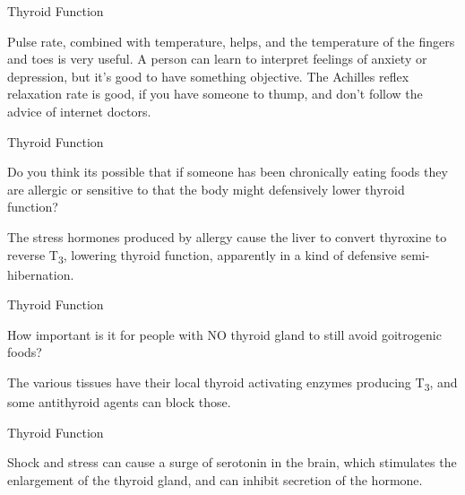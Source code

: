 \documentclass[11pt,oneside,openany,extrafontsizes]{memoir}
\begin{document}
\begin{standalonequote}{Thyroid Function}

    \begin{answer}
      Pulse rate, combined with temperature, helps, and the temperature of the fingers and toes is very useful. A person can learn to interpret feelings of anxiety or depression, but it's good to have something objective. The Achilles reflex relaxation rate is good, if you have someone to thump, and don't follow the advice of internet doctors.
    \end{answer}
\end{standalonequote}

\begin{qaexchange}{Thyroid Function}

    \begin{question}
        Do you think its possible that if someone has been chronically eating foods they are allergic or sensitive to that the body might defensively lower thyroid function?
    \end{question}

    \begin{answer}
      The stress hormones produced by allergy cause the liver to convert thyroxine to reverse T\textsubscript{3}, lowering thyroid function, apparently in a kind of defensive semi-hibernation.
    \end{answer}
\end{qaexchange}

\begin{qaexchange}{Thyroid Function}

    \begin{question}
        How important is it for people with NO thyroid gland to still avoid goitrogenic foods?
    \end{question}

    \begin{answer}
      The various tissues have their local thyroid activating enzymes producing T\textsubscript{3}, and some antithyroid agents can block those.
    \end{answer}
\end{qaexchange}

\begin{standalonequote}{Thyroid Function}

    \begin{answer}
      Shock and stress can cause a surge of serotonin in the brain, which stimulates the enlargement of the thyroid gland, and can inhibit secretion of the hormone.
    \end{answer}
\end{standalonequote}
\end{document}
